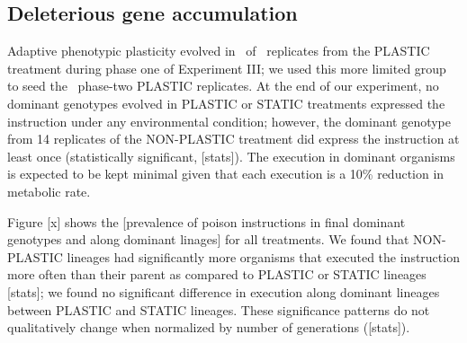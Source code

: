 \vspace{0.5cm}
\subsection{Deleterious gene accumulation}


Adaptive phenotypic plasticity evolved in \deleteriousHitchhikingPlasticReps\ of \deleteriousHitchhikingReplicates\ replicates from the PLASTIC treatment during phase one of Experiment III; we used this more limited group to seed the \deleteriousHitchhikingPlasticReps\ phase-two PLASTIC replicates.
At the end of our experiment, no dominant genotypes evolved in PLASTIC or STATIC treatments expressed the  instruction under any environmental condition; however, the dominant genotype from 14 replicates of the NON-PLASTIC treatment did express the  instruction at least once (statistically significant, [stats]).
The  execution in dominant organisms is expected to be kept minimal given that each execution is a 10\% reduction in metabolic rate.


Figure [x] shows the [prevalence of poison instructions in final dominant genotypes and along dominant linages] for all treatments.
We found that NON-PLASTIC lineages had significantly more organisms that executed the  instruction more often than their parent as compared to PLASTIC or STATIC lineages [stats]; we found no significant difference in  execution along dominant lineages between PLASTIC and STATIC lineages.
These significance patterns do not qualitatively change when normalized by number of generations ([stats]).

